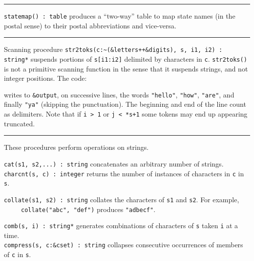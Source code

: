 \pagebreak

\vspace{0.25cm}\hrule{}

\texttt{statemap() : table} produces a
``two-way'' table to map state names (in the postal sense) to their postal abbreviations
and vice-versa.

\vspace{0.25cm}\hrule{}

Scanning procedure \texttt{str2toks(c:\~{}(\&letters++\&digits),
s, i1, i2) : string*} suspends portions of \texttt{s[i1:i2]} delimited
by characters in \texttt{c}. \texttt{str2toks()} is not a primitive
scanning function in the sense that it suspends strings, and not
integer positions. The code:


\noindent writes to \texttt{\&output}, on successive lines, the words
\texttt{"hello"},
\texttt{"how"},
\texttt{"are"}, and finally
\texttt{"ya"} (skipping the punctuation).
The beginning and end of the line count as delimiters. Note
that if \texttt{i {\textgreater} 1} or \texttt{j {\textless} *s+1} some
tokens may end up appearing truncated.

\vspace{0.25cm}\hrule{}

These procedures perform operations on strings. 

\texttt{cat(s1, s2,...) : string} concatenates an arbitrary number of
strings.\\
\texttt{charcnt(s, c) : integer} returns the number of instances of
characters in \texttt{c} in \texttt{s}.

\texttt{collate(s1, s2) : string} collates the characters
of \texttt{s1} and \texttt{s2}. For example,\\
 \ \ \ \ \ \texttt{collate("abc", "def")} produces \texttt{"adbecf"}.

\texttt{comb(s, i) : string*} generates combinations of characters of \texttt{s} taken \texttt{i} at a time.\\
\texttt{compress(s, c:\&cset) : string} collapses consecutive
occurrences of members of \texttt{c} in \texttt{s}.

